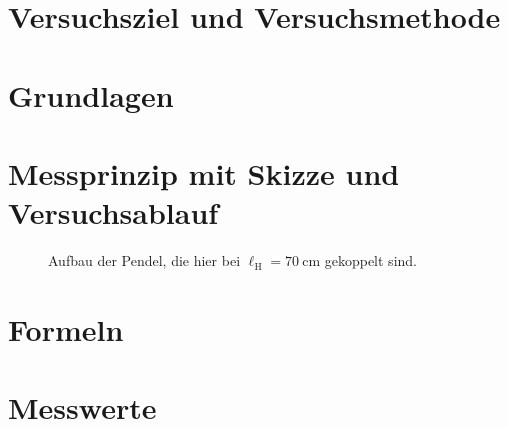 \documentclass[
12pt,
a4paper,
bibliography=totocnumbered, %
twoside, %
BCOR=1cm, %
]{scrartcl}
\newcommand{\lh}{\ell_{\mathrm{H}}}
\begin{document}
\thispagestyle{empty}



\thispagestyle{empty}

\tableofcontents

\clearpage %

\renewcommand{\thepage}{\arabic{page}}
\setcounter{page}{1}


\section[Versuchsziel]{Versuchsziel und Versuchsmethode}



\section{Grundlagen}




\section[Messprinzip]{Messprinzip mit Skizze und Versuchsablauf}

\begin{figure}[H]
	\caption{Aufbau der Pendel, die hier bei \(\lh = \qty{70}{\centi\meter}\) gekoppelt sind.}
	\label{fig:aufbau}
\end{figure}



\section[Formeln]{Formeln}

\section{Messwerte}
\end{document}

